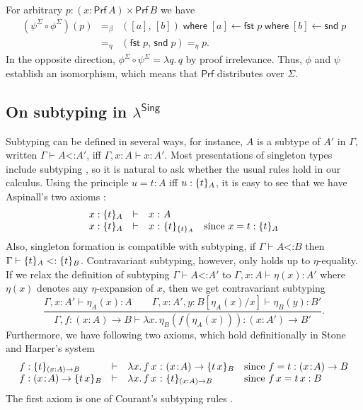 \documentclass{LMCS}
\theoremstyle{plain}\newtheorem{satz}[thm]{Satz}
\newcommand{\of}{\!:\!}
\newcommand{\subtype}{\mathrel{\mathord{<}\mathord{:}}}
\newcommand{\derN}{\vdash}
\newcommand{\ABwhere}[3]{#1 \; \mathsf{where}\; [#2] \leftarrow #3}
\newcommand{\lambdaSing}{\texorpdfstring{\ensuremath{\lambda^{\mathsf{Sing}}}}{Singletons}}
\newcommand{\funT}[2]{(#1 \of #2) \to}
\newcommand{\funS}[2]{(#1 : #2) \to}
\newcommand{\sigT}[2]{(#1 \of #2) \times}
\newcommand{\dfst}[1]{\mathsf{fst}\;#1}
\newcommand{\dsnd}[1]{\mathsf{snd}\;#1}
\newcommand{\boxty}[1]{[#1]}
\newcommand{\boxtm}[1]{[#1]}
\renewcommand{\boxty}[1]{\mathsf{Prf}\,#1}
\newcommand{\prfraw}{\mathsf{Prf}}
\begin{document}
For arbitrary $p : \sigT x {\boxty A} {\boxty B}$ we have
\[
\begin{array}{lcl}
  (\psi^\Sigma \circ \phi^\Sigma)(p) 
    & =_\beta & \ABwhere {\ABwhere {(\boxtm a,\, \boxtm b)} a {\dfst p}} b {\dsnd p}
\\  & =_\eta  & (\dfst p,\, \dsnd p) =_\eta  p .
\end{array}
\]
In the opposite direction, $\phi^\Sigma \circ \psi^\Sigma = \lambda
q.\, q$ by proof irrelevance.  Thus, $\phi$ and $\psi$ establish an
isomorphism, which means that $\prfraw$ distributes over $\Sigma$.


\subsection{On subtyping in \lambdaSing}

Subtyping can be defined in several ways, for instance, $A$ is a
subtype of $A'$ in $\Gamma$, written $\Gamma \derN A \subtype A'$,
iff $\Gamma, x \of A \derN x \of A'$.
Most presentations of singleton types include
subtyping \cite{aspinall:csl94,courant:itrs02,stoneHarper:tocl06}, so
it is natural to ask whether the usual rules hold in our calculus.
Using the principle $u = t : A$ iff $u : \{t\}_{A}$, it is easy to
see that we have Aspinall's two axioms \cite{aspinall:csl94}:
\[
\begin{array}{lcl@{~}c@{~}ll}
  x : \singTm t A & \derN & x & : & A \\
  x : \singTm t A & \derN & x & : & \singTm t {\singTm t A}
   & \mbox{since } x = t : \singTm t A
\end{array}
\]
Also, singleton formation is compatible with subtyping, if $\Gamma
\derN A \subtype B$ then $\Gamma \derN \singTm t A \subtype \singTm t
B$.  Contravariant subtyping, however, only holds up to
$\eta$-equality.  If we relax the definition of subtyping $\Gamma
\derN A \subtype A'$ to $\Gamma, x \of A \derN \eta(x) \of A'$ where
$\eta(x)$ denotes any $\eta$-expansion of $x$, then we get
contravariant subtyping
\[
  \dfrac{\Gamma, x \of A' \derN \eta_A(x) : A \qquad
         \Gamma, x \of A', y \of B[\eta_A(x)/x] \derN \eta_B(y) : B'
       }{\Gamma, f \of \funT x A B \derN 
           \lambda x.\, \eta_B(f(\eta_A(x))) : \funT x {A'} B'}.
\]
Furthermore, we have following two axioms, which hold definitionally in Stone and
Harper's system \cite{stoneHarper:tocl06}
\[
\begin{array}{lcl@{~}c@{~}ll}
  f : \singTm t {\funS x A B} & \derN & 
    \lambda x.\,f\,x 
     & : &  \funT x A \singTm {t\,x} B 
     & \mbox{since } f = t : \funT x A B \\
  f : \funT x A \singTm {t\,x} B & \derN & 
  \lambda x.\,f\,x 
     & : & \singTm t {\funS x A B} 
     & \mbox{since } f\,x = t\,x : B \\
\end{array}
\]
The first axiom is one of Courant's subtyping rules \cite{courant:itrs02}. 
\end{document}
